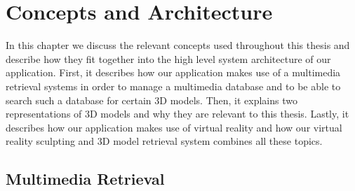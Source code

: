 \chapter{Concepts and Architecture}
\label{chap:concepts_and_architecture}

In this chapter we discuss the relevant concepts used throughout this thesis and describe how they fit together into the high level system architecture of our
application. First, it describes how our application makes use of a multimedia retrieval systems in order to manage a multimedia database and to be able to search such a database for certain 3D models.
Then, it explains two representations of 3D models and why they are relevant to this thesis. Lastly, it describes how our application makes use of virtual reality and how our virtual reality sculpting and 3D model retrieval system combines all these topics.

\section{Multimedia Retrieval}
\label{sec:multimedia_retrieval_concept}

